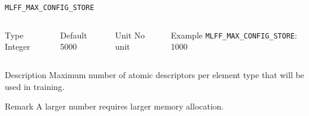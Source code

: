 \begin{frame}[allowframebreaks]{\texttt{{MLFF\_MAX\_CONFIG\_STORE}}} \label{MLFF_MAX_CONFIG_STORE}
\vspace*{-12pt}
\begin{columns}
\begin{block}{Type}
Integer
\end{block}

\begin{block}{Default}
5000
\end{block}

\begin{block}{Unit}
No unit
\end{block}

\begin{block}{Example}
\texttt{MLFF\_MAX\_CONFIG\_STORE}: 1000
\end{block}
\end{columns}

\begin{block}{Description}
 Maximum number of atomic descriptors per element type that will be used in training.
\end{block}

\begin{block}{Remark}
A larger number requires larger memory allocation.
\end{block}
\end{frame}


